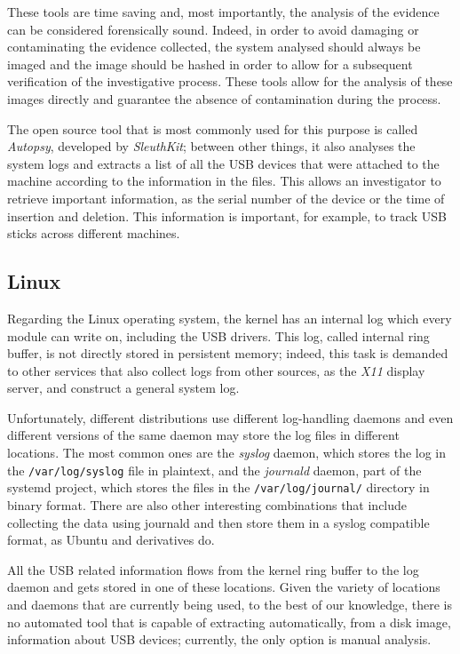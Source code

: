 \documentclass[a4paper]{article}
\begin{document}
These tools are time saving and, most importantly, the analysis of the evidence
can be considered forensically sound. Indeed, in order to avoid damaging or
contaminating the evidence collected, the system analysed should always be
imaged and the image should be hashed in order to allow for a subsequent
verification of the investigative process. These tools allow for the analysis of
these images directly and guarantee the absence of contamination during the
process.~\cite{murphey2007automated}

The open source tool that is most commonly used for this purpose is called
\emph{Autopsy}, developed by \emph{SleuthKit}; between other things, it also
analyses the system logs and extracts a list of all the USB devices that were
attached to the machine according to the information in the files. This allows
an investigator to retrieve important information, as the serial number of the
device or the time of insertion and deletion. This information is important, for
example, to track USB sticks across different machines.~\cite{deb2015usb}

\subsection{Linux}
Regarding the Linux operating system, the kernel has an internal log which every
module can write on, including the USB drivers. This log, called internal ring
buffer, is not directly stored in persistent memory; indeed, this task is
demanded to other services that also collect logs from other sources, as the
\emph{X11} display server, and construct a general system log.

Unfortunately, different distributions use different log-handling daemons and
even different versions of the same daemon may store the log files in
different locations. The most common ones are the \emph{syslog} daemon, which
stores the log in the \texttt{/var/log/syslog} file in plaintext, and the
\emph{journald} daemon, part of the systemd project, which stores the files in
the \texttt{/var/log/journal/} directory in binary format. There are also other
interesting combinations that include collecting the data using journald and
then store them in a syslog compatible format, as Ubuntu and derivatives
do.~\cite{poettering2012journal}

All the USB related information flows from the kernel ring buffer to the log
daemon and gets stored in one of these locations. Given the variety of locations
and daemons that are currently being used, to the best of our knowledge, there
is no automated tool that is capable of extracting automatically, from a disk
image, information about USB devices; currently, the only option is manual
analysis.
\end{document}
